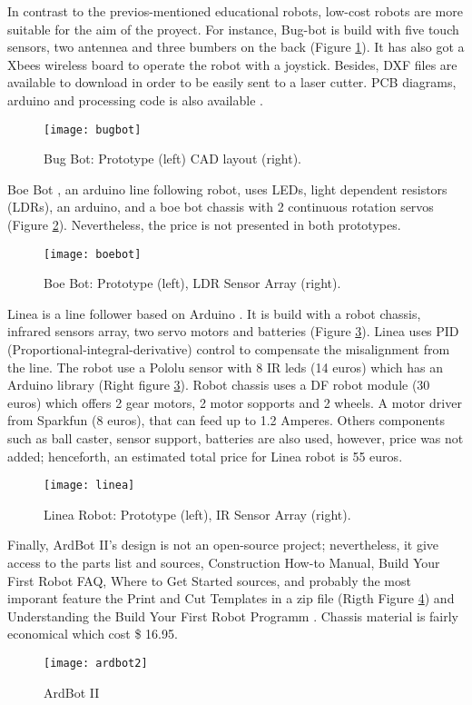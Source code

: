  
In contrast to the previos-mentioned educational robots, low-cost robots are more 
suitable for the aim of the proyect. For instance, Bug-bot is build with five touch 
sensors, two antennea and three bumbers on 
the back (Figure \ref{fig:bugbot}). It has also got a Xbees wireless board to operate 
the robot with a joystick. Besides, DXF files are available to download in order to be 
easily sent to a laser cutter. PCB diagrams, arduino and processing code is also 
available \cite{bugbot}. 
\begin{figure}[htbp!] 
\centering    
\texttt{[image: bugbot]}
\caption[PA]{Bug Bot: Prototype (left) CAD layout (right).}
\label{fig:bugbot}
\end{figure}

Boe Bot \cite{boebot}, an arduino line following robot, uses LEDs, light dependent 
resistors (LDRs), an arduino, and a boe bot chassis with 2 continuous rotation servos 
(Figure \ref{fig:boebot}). Nevertheless, the price is not presented in both prototypes.
\begin{figure}[htbp!] 
\centering    
\texttt{[image: boebot]}
\caption[PA]{Boe Bot: Prototype (left), LDR Sensor Array (right).}
\label{fig:boebot}
\end{figure}
 
Linea is a line follower based on Arduino \cite{linea}. It is build with a robot chassis, 
infrared sensors array, two servo motors and batteries (Figure \ref{fig:linea}). Linea 
uses PID (Proportional-integral-derivative) control to compensate the misalignment from 
the line. The robot use a Pololu sensor with 8 IR leds (14 euros) which has an Arduino 
library (Right figure \ref{fig:linea}). Robot chassis uses a DF robot module (30 euros) 
which offers 2 gear motors, 2 motor sopports and 2 wheels. A motor driver from Sparkfun 
(8 euros), that can feed up to 1.2 Amperes. Others components such as ball caster, sensor 
support, batteries are also used, however, price was not added; henceforth, an estimated 
total price for Linea robot is 55 euros. 
\begin{figure}[htbp!] 
\centering    
\texttt{[image: linea]}
\caption[PA]{Linea Robot: Prototype (left), IR Sensor Array (right).}
\label{fig:linea}
\end{figure}

Finally, ArdBot II's design is not an open-source project; nevertheless, it give access 
to the parts list and sources, Construction How-to Manual, Build Your First Robot FAQ,
Where to Get Started sources, and probably the most imporant feature the Print and Cut 
Templates in a zip file  (Rigth Figure \ref{fig:ardbotii}) and Understanding the Build 
Your First Robot Programm \cite{ardbot2}. Chassis material is fairly economical which 
cost \$ 16.95.
\begin{figure}[htbp!] 
\centering    
\texttt{[image: ardbot2]}
\caption[PA]{ArdBot II}
\label{fig:ardbotii}
\end{figure}

